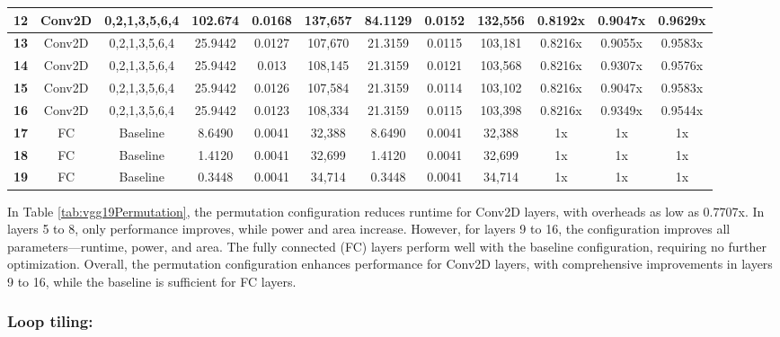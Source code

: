 \begin{table}[htbp]
{\begin{tabular}{|c|c|c|c|c|c|c|c|c|c|c|c|}
\textbf{12} & Conv2D & 0,2,1,3,5,6,4 & 102.674 & 0.0168   & 137,657 & 84.1129 & 0.0152  & 132,556 & 0.8192x & 0.9047x & 0.9629x \\ \hline
\textbf{13} & Conv2D & 0,2,1,3,5,6,4 & 25.9442 & 0.0127  & 107,670 & 21.3159 & 0.0115  & 103,181 & 0.8216x & 0.9055x & 0.9583x \\ \hline
\textbf{14} & Conv2D & 0,2,1,3,5,6,4 & 25.9442 & 0.013  & 108,145 & 21.3159 & 0.0121  & 103,568 & 0.8216x & 0.9307x & 0.9576x \\ \hline
\textbf{15} & Conv2D & 0,2,1,3,5,6,4 & 25.9442 & 0.0126  & 107,584 & 21.3159 & 0.0114  & 103,102 & 0.8216x & 0.9047x & 0.9583x \\ \hline
\textbf{16} & Conv2D & 0,2,1,3,5,6,4 & 25.9442 & 0.0123  & 108,334 & 21.3159 & 0.0115  & 103,398 & 0.8216x & 0.9349x & 0.9544x \\ \hline
\textbf{17} & FC  & Baseline & 8.6490  & 0.0041  & 32,388  & 8.6490  & 0.0041  & 32,388 & 1x & 1x & 1x \\ \hline
\textbf{18} & FC  & Baseline & 1.4120  & 0.0041  & 32,699  & 1.4120  & 0.0041  & 32,699 & 1x & 1x & 1x  \\ \hline
\textbf{19} & FC  & Baseline & 0.3448  & 0.0041  & 34,714  & 0.3448  & 0.0041  & 34,714 & 1x & 1x & 1x  \\ \hline
\end{tabular}
}
\end{table}
In Table \ref{tab:vgg19Permutation}, the permutation configuration reduces runtime for Conv2D layers, with overheads as low as 0.7707x. In layers 5 to 8, only performance improves, while power and area increase. However, for layers 9 to 16, the configuration improves all parameters—runtime, power, and area. The fully connected (FC) layers perform well with the baseline configuration, requiring no further optimization. Overall, the permutation configuration enhances performance for Conv2D layers, with comprehensive improvements in layers 9 to 16, while the baseline is sufficient for FC layers.

\clearpage
\subsubsection{Loop tiling:}

